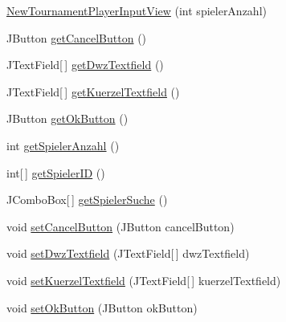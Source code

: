 \begin{DoxyCompactItemize}
\item 
\hyperlink{classde_1_1turnierverwaltung_1_1view_1_1_new_tournament_player_input_view_ad984b8a410d5a92cd9c980d444136d45}{New\+Tournament\+Player\+Input\+View} (int spieler\+Anzahl)
\item 
J\+Button \hyperlink{classde_1_1turnierverwaltung_1_1view_1_1_new_tournament_player_input_view_a962c0f59e306aa059752744d51a49694}{get\+Cancel\+Button} ()
\item 
J\+Text\+Field\mbox{[}$\,$\mbox{]} \hyperlink{classde_1_1turnierverwaltung_1_1view_1_1_new_tournament_player_input_view_a4a21952b88d49117455d48fd77ae0762}{get\+Dwz\+Textfield} ()
\item 
J\+Text\+Field\mbox{[}$\,$\mbox{]} \hyperlink{classde_1_1turnierverwaltung_1_1view_1_1_new_tournament_player_input_view_aecf646ba4613618aff353b2863f99cf3}{get\+Kuerzel\+Textfield} ()
\item 
J\+Button \hyperlink{classde_1_1turnierverwaltung_1_1view_1_1_new_tournament_player_input_view_a948a0f45dbd961bb90e713ffa19ebe00}{get\+Ok\+Button} ()
\item 
int \hyperlink{classde_1_1turnierverwaltung_1_1view_1_1_new_tournament_player_input_view_af3775f16ffff2eb36418fb0421061cb0}{get\+Spieler\+Anzahl} ()
\item 
int\mbox{[}$\,$\mbox{]} \hyperlink{classde_1_1turnierverwaltung_1_1view_1_1_new_tournament_player_input_view_a1b84bb19d6355ec5bc6f689236612dd4}{get\+Spieler\+ID} ()
\item 
J\+Combo\+Box\mbox{[}$\,$\mbox{]} \hyperlink{classde_1_1turnierverwaltung_1_1view_1_1_new_tournament_player_input_view_a8ba96ff8fc8d67d90e72e9969b5834c2}{get\+Spieler\+Suche} ()
\item 
void \hyperlink{classde_1_1turnierverwaltung_1_1view_1_1_new_tournament_player_input_view_aeb9160a7bf512aa26227cd203a32acab}{set\+Cancel\+Button} (J\+Button cancel\+Button)
\item 
void \hyperlink{classde_1_1turnierverwaltung_1_1view_1_1_new_tournament_player_input_view_a2debb6e10b6b5ff9b33dfb91ca0d3fda}{set\+Dwz\+Textfield} (J\+Text\+Field\mbox{[}$\,$\mbox{]} dwz\+Textfield)
\item 
void \hyperlink{classde_1_1turnierverwaltung_1_1view_1_1_new_tournament_player_input_view_a20bd5e9aa876f0a4c97ca94d1813ffda}{set\+Kuerzel\+Textfield} (J\+Text\+Field\mbox{[}$\,$\mbox{]} kuerzel\+Textfield)
\item 
void \hyperlink{classde_1_1turnierverwaltung_1_1view_1_1_new_tournament_player_input_view_a031955263f7978e137c60d771058c985}{set\+Ok\+Button} (J\+Button ok\+Button)

\end{DoxyCompactItemize}
